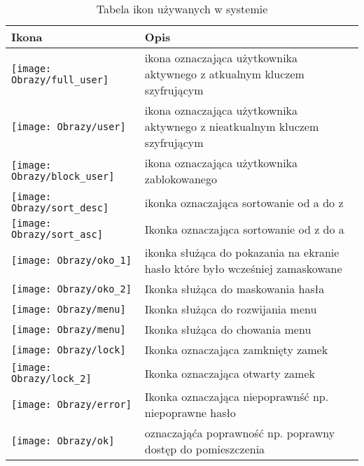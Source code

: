 	   
	   	\begin{longtable}[!ht]{|m{2cm}|m{10cm}|} 
	   	\caption{Tabela ikon używanych w systemie}
	   	\label{tab:ikony}\\
	   	\hline	
	   	Ikona & Opis   \\	\hline
	   	
	  \texttt{[image: Obrazy/full\_user]} 	&  	ikona oznaczająca użytkownika  aktywnego z atkualnym kluczem szyfrującym 	 
	   	\\	\hline
	   	\texttt{[image: Obrazy/user]} & 	ikona oznaczająca użytkownika  aktywnego z nieatkualnym kluczem szyfrującym \\	\hline
	   		\texttt{[image: Obrazy/block\_user]}&ikona oznaczająca użytkownika zablokowanego \\	\hline
	   	\texttt{[image: Obrazy/sort\_desc]}&ikonka oznaczająca sortowanie od a do z		
	   	\\	\hline				
	   	\texttt{[image: Obrazy/sort\_asc]}&Ikonka oznaczająca sortowanie od z do a
	   	\\	\hline
	   	\texttt{[image: Obrazy/oko\_1]}	&	ikonka służąca do  pokazania na ekranie hasło które było wcześniej zamaskowane
	   	\\	\hline
	    \texttt{[image: Obrazy/oko\_2]}&Ikonka służąca do maskowania hasła
	   	\\	\hline
	   	\texttt{[image: Obrazy/menu]}&Ikonka służąca do rozwijania menu
	   	\\	\hline
	   	\texttt{[image: Obrazy/menu]}&Ikonka służąca do chowania menu
	   	\\	\hline
	   	\texttt{[image: Obrazy/lock]}&Ikonka oznaczająca zamknięty zamek
		\\	\hline		
	   	\texttt{[image: Obrazy/lock\_2]}&Ikonka oznaczająca otwarty zamek
	   	\\	\hline					
	   	\texttt{[image: Obrazy/error]}&Ikonka oznaczająca niepoprawnść np. niepoprawne hasło
	   \\	\hline
	   \texttt{[image: Obrazy/ok]}&oznaczająća poprawność np. poprawny dostęp do pomieszczenia	
	   	\\	\hline				
	   					
	   \end{longtable}
	   

